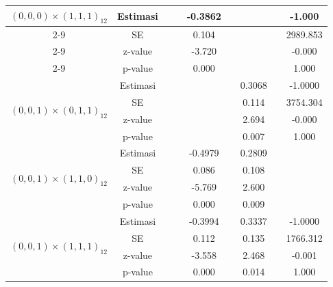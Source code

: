 \begin{enumerate}[label=\alph*.]
\begin{longtable}{|c|c|c|c|c|c|c|c|c|}
            \multirow{4}{*}{$(0,0,0)\times(1,1,1)_{12}$}
            & Estimasi & {} & {} & -0.3862 & {} & {} & {} & -1.000\\ \cline{2-9}
            & SE       & {} & {} & 0.104 & {} & {} & {} & 2989.853\\ \cline{2-9}
            & z-value  & {} & {} & -3.720 & {}   & {}   & {} & -0.000\\ \cline{2-9}
            & p-value  & {} & {} & 0.000 & {} & {} & {} & 1.000\\ \hline

            \multirow{4}{*}{$(0,0,1)\times(0,1,1)_{12}$}
            & Estimasi & {} & {} & {} & {} & 0.3068 & {} & -1.0000 \\ \cline{2-9}
            & SE       & {} & {} & {} & {} & 0.114 & {} & 3754.304\\ \cline{2-9}
            & z-value  & {} & {} & {} & {} & 2.694 & {} & -0.000\\ \cline{2-9}
            & p-value  & {} & {} & {} & {} & 0.007 & {} & 1.000\\ \hline

            \multirow{4}{*}{$(0,0,1)\times(1,1,0)_{12}$}
            & Estimasi & {} & {} & -0.4979 & {}  & 0.2809 & {} & {}\\ \cline{2-9}
            & SE       & {} & {} & 0.086 & {} & 0.108 & {} & {}\\ \cline{2-9}
            & z-value  & {} & {} & -5.769 & {} & 2.600 & {} & {}\\ \cline{2-9}
            & p-value  & {} & {} & 0.000 & {} & 0.009 & {} & {} \\ \hline

            \multirow{4}{*}{$(0,0,1)\times(1,1,1)_{12}$}
            & Estimasi & {} & {} & -0.3994 & {} & 0.3337 & {} & -1.0000 \\ \cline{2-9}
            & SE       & {} & {} & 0.112   & {} & 0.135 & {} & 1766.312\\ \cline{2-9}
            & z-value  & {} & {} & -3.558  & {} & 2.468 & {} & -0.001\\ \cline{2-9}
            & p-value  & {} & {} & 0.000   & {} & 0.014 & {} & 1.000 \\ \hline


\end{longtable}
\end{enumerate}
